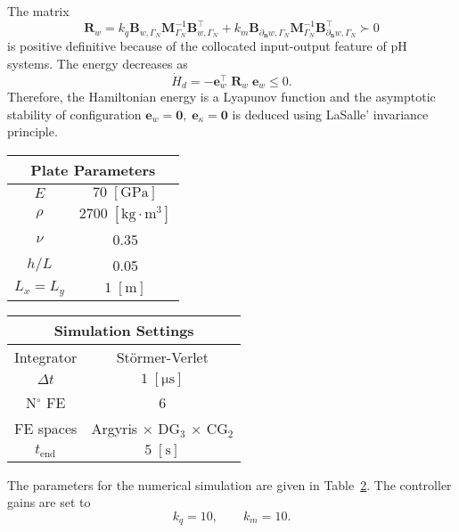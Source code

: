 The matrix 
$$\mathbf{R}_w = k_q \mathbf{B}_{w, \Gamma_N} \mathbf{M}_{\Gamma_N}^{-1} \mathbf{B}_{w, \Gamma_N}^\top + k_m \mathbf{B}_{\partial_{\bm{n}} w, \Gamma_N} \mathbf{M}_{\Gamma_N}^{-1} \mathbf{B}_{\partial_{\bm{n}} w, \Gamma_N}^\top \succ 0$$
 is positive definitive because of the collocated input-output feature of pH systems. The energy decreases as \cite[Theorem 13]{beattie2018linear}
\[\dot{H} _{d} = - \mathbf{e}_{w}^\top \; \mathbf{R}_w \; \mathbf{e}_{w} \le 0. \]
Therefore, the Hamiltonian energy is a Lyapunov function and the asymptotic stability of configuration $\mathbf{e}_{w} = \mathbf{0}, \; \mathbf{e}_{\kappa} = \mathbf{0}$ is deduced using LaSalle' invariance  principle. \\


\begin{table}[t]
	\centering
	\begin{tabular}{|c|c|}
		\hline 
		\multicolumn{2}{|c|}{Plate Parameters} \\ 
		\hline 
		$E$ & $70\; \mathrm{[GPa]}$ \\ 
		$\rho$ & $2700\; \mathrm{[kg \cdot m^3]}$ \\ 
		$\nu$& 0.35 \\ 
		$h/L$& 0.05 \\ 
		$L_x = L_y$& $1\; \mathrm{[m]}$\\ 
		\hline 
	\end{tabular} \hspace{1cm}
	\begin{tabular}{|c|c|}
		\hline 
		\multicolumn{2}{|c|}{Simulation Settings} \\
		\hline 
		Integrator & St\"ormer-Verlet \\
		$\Delta t $ & $1 \; \mathrm{[\mu s]}$ \\  
		N$^\circ$ FE & 6 \\
		FE spaces & Argyris $\times$ DG$_3$ $\times$ CG$_2$\\
		$t_{\text{end}}$ & $5\; \mathrm{[s]}$\\ 
		\hline 
	\end{tabular} 
	\captionsetup{width=0.95\linewidth}
	\vspace{1mm}
	\label{tab:parKir_damp}
\end{table}

The parameters for the numerical simulation are given in Table~\ref{tab:parKir_damp}. The controller gains are set to 
\begin{equation}
	k_q = 10, \qquad k_m = 10.
\end{equation}

